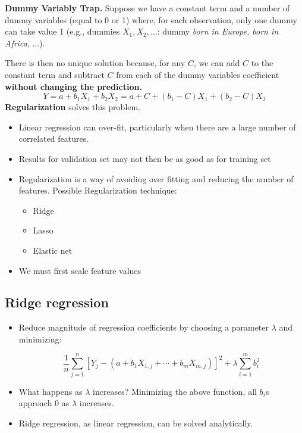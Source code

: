 \textbf{Dummy Variably Trap.} Suppose we have a constant term and a number of dummy variables (equal to 0 or 1) where, for each observation, only one dummy can take value 1 (e.g., dummies $X_{1},X_{2},\dotsc $: dummy \textit{born in Europe, born in Africa}, ...).

There is then no unique solution because, for any $C$, we can add $C$ to the constant term and subtract $C$ from each of the dummy variables coefficient \textbf{without changing the prediction.}
\begin{equation*}
    Y = a+b_{1} X_{1} +b_{2} X_{2} =a+C+(b_{1} -C) X_{1} +(b_{2} -C) X_{2}
\end{equation*}
\textbf{Regularization} solves this problem.
\begin{itemize}
    \item Linear regression can over-fit, particularly when there are a large number of correlated features.
    \item Results for validation set may not then be as good as for training set
    \item Regularization is a way of avoiding over fitting and reducing the number of features. Possible Regularization technique:
          \begin{itemize}
              \item Ridge 
              \item Lasso
              \item Elastic net
          \end{itemize}
    \item We must first scale feature values
\end{itemize}

\subsection{Ridge regression}

\begin{itemize}
    \item Reduce magnitude of regression coefficients by choosing a parameter $\lambda $ and minimizing:
          
          \begin{equation*}
              \frac{1}{n}\sum\limits _{j=1}^{n}\left[ Y_{j} -\left(a+b_{1} X_{1,j} +\cdots +b_{m} X_{m,j}\right)\right]^{2} +\lambda \sum _{i=1}^{m} b_{i}^{2}
          \end{equation*}
    \item What happens as $\lambda $ increases? Minimizing the above function, all $b_{i}$s approach 0 as $\lambda $ increases.
    \item Ridge regression, as linear regression, can be solved analytically.
\end{itemize}

